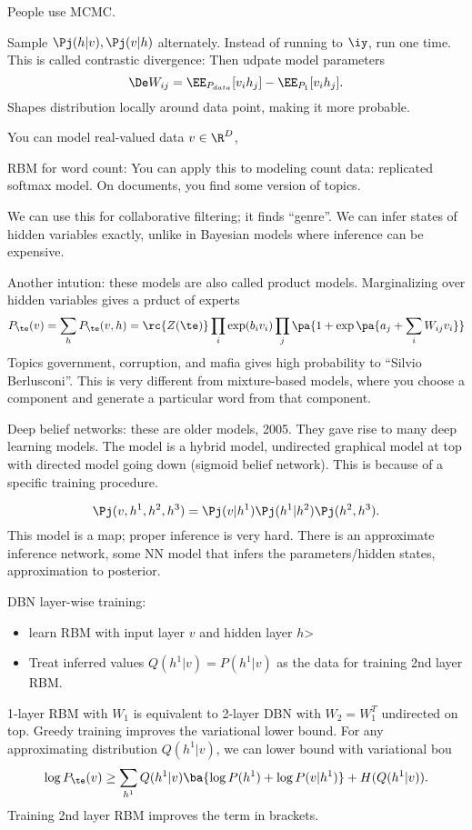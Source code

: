 People use MCMC.

Sample $\Pj(h|v), \Pj(v|h)$ alternately. Instead of running to $\iy$, run one time. This is called contrastic divergence: Then udpate model parameters
$$
\De W_{ij}  = \EE_{P_{data}} [v_ih_j] - \EE_{P_1}[v_ih_j].
$$
Shapes distribution locally around data point, making it more probable.

You can model real-valued data $v\in \R^D$, 


RBM for word count: 
You  can apply this to modeling count data: replicated softmax model.
On documents, you find some version of topics.

We can use this for collaborative filtering; it finds ``genre''. 
We can infer states of hidden variables exactly, unlike in Bayesian models where inference can be expensive.

Another intution: these models are also called product models. Marginalizing over hidden variables gives a prduct of experts
$$
P_\te(v) = \sum_h P_\te(v,h) = \rc{Z(\te)}\prod_i \exp(b_iv_i)\prod_j \pa{1+\exp\pa{a_j + \sum_i W_{ij}v_i}}
$$
Topics government, corruption, and mafia gives high probability to ``Silvio Berlusconi''. This is very different from mixture-based models, where you choose a component and generate a particular word from that component. 

Deep belief networks: these are older models, 2005. They gave rise to many deep learning models. 
The model is a hybrid model, undirected graphical model at top with directed model going down (sigmoid belief network). This is because of a specific training procedure.

$$\Pj(v,h^1,h^2,h^3) = \Pj(v|h^1)\Pj(h^1|h^2)\Pj(h^2,h^3).$$
This model is a map; proper inference is very hard. 
There is an approximate inference network, some NN model that infers the parameters/hidden states, approximation to posterior. 

DBN layer-wise training: 
\begin{itemize}
\item
learn RBM with input layer $v$ and hidden layer $h$>
\item
Treat inferred values $Q(h^1|v) = P(h^1|v)$ as the data for training 2nd layer RBM.
\end{itemize}
1-layer RBM with $W_1$ is equivalent to 2-layer DBN with $W_2=W_1^T$ undirected on top.
Greedy training improves the variational lower bound.
For any approximating distribution $Q(h^1|v)$, we can lower bound with variational bou
$$\log P_\te(v) \ge \sum_{h^1} Q(h^1|v) \ba{\log P(h^1) + \log P(v|h^1)} + H(Q(h^1|v)).$$
Training 2nd layer RBM improves the term in brackets.

